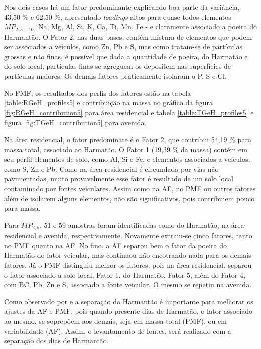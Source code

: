 Nos dois casos há um fator predominante explicando boa parte da variância,
43,50 \% e 62,50 \%, apresentado \textit{loadings} altos para quase todos  
elementos - $MP_{2,5-10}$, Na, Mg, Al, Si, K, Ca, Ti, Mn, Fe - 
e claramente associado a poeira do Harmantão. 
O Fator 2, nas duas bases, contém mistura de elementos que podem ser associados 
a veículos, como Zn, Pb e S, mas como tratam-se de partículas grossas e não finas, 
é possível que dada a quantidade de poeira, do Harmatão e do solo local, 
partículas finas se agreguem os depositem nas superfícies de partículas maiores. 
Os demais fatores praticamente isolaram o P, S e Cl. 

No PMF, os resultados dos perfis dos fatores estão na tabela 
\ref{table:RGeH_profiles5} e contribuição na massa no gráfico da figura
\ref{fig:RGeH_contribution5} para área residencial e tabela 
\ref{table:TGeH_profiles5} e figura \ref{fig:TGeH_contribution5} para 
avenida. 

Na área residencial, o fator predominate é o Fator 2, que contribui
54,19 \% para massa total, associado ao Harmatão. O Fator 1 (19,39 \% da massa)
contém em seu perfil elementos de solo, como Al, Si e Fe, e elementos associados
a veículos, como S, Zn e Pb. Como na área residencial é circundada por vias 
não pavimentadas, muito provavelmente esse fator é resultado de um solo local
contaminado por fontes veículares. Assim como na AF, no PMF ou outros fatores 
além de isolarem alguns elementos, não são significativos, pois contribuiem 
pouco para massa. 

Para $MP_{2,5}$, 51 e 59 amostras foram identificadas como do Harmatão, 
na área residencial e avenida, respectivamente. Novamente extraiu-se cinco
fatores, tanto no PMF quanto na AF. No fino, a AF separou bem o fator da 
poeira do Harmatão do fator veicular, mas continuou não encotrando nada para 
os demais fatores. Já o PMF distinguiu melhor os fatores, pois na área 
residencial, separou o fator associado a solo local, Fator 1, do Harmatão, 
Fator 5, além do Fator 4, com BC, Pb, Zn e S, associado a fonte veicular. 
O mesmo se repetiu na avenida.    

Como observado por \citet{aboh2009} e \citet{ofosu2013} a separação do Harmantão
é importante para melhorar os ajustes da AF e PMF, pois quando presente dias de
 Harmatão, o fator associado ao mesmo, se soprepõem 
aos demais, seja em massa total (PMF), ou em variabilidade (AF). Assim, 
o levantamento de fontes, será realizado com a separação dos dias de Harmantão.     

